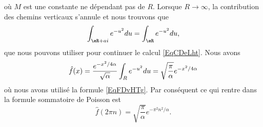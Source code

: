 \begin{example}
    où \( M\) est une constante ne dépendant pas de \( R\). Lorsque \( R\to \infty\), la contribution des chemins verticaux s'annule et nous trouvons que
    \begin{equation}    \label{EqjrNxLr}
        \int_{\eR+ai} e^{-u^2}du=\int_{\eR} e^{-u^2}du,
    \end{equation}
    que nous pouvons utiliser pour continuer le calcul \eqref{EqCDeLht}. Nous avons
    \begin{equation}
        \hat f(x)= \frac{ e^{-x^2/4\alpha}}{\sqrt{\alpha}}\int_{R} e^{-u^2}du\\
            =\sqrt{\frac{ \pi }{ \alpha }} e^{-x^2/4\alpha}
    \end{equation}
    où nous avons utilisé la formule \eqref{EqFDvHTg}. Par conséquent ce qui rentre dans la formule sommatoire de Poisson est
    \begin{equation}
        \hat f(2\pi n)=\sqrt{\frac{ \pi }{ \alpha }} e^{-\pi^2 n^2/\alpha}.
    \end{equation}
\end{example}


